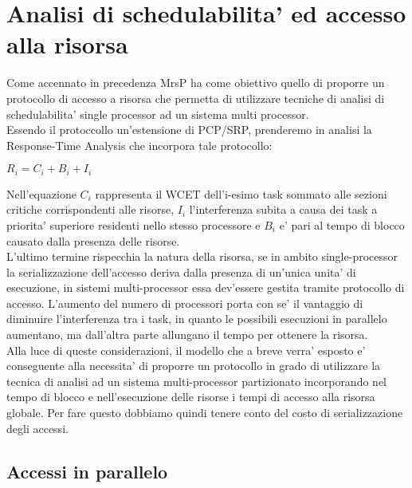 \documentclass[a4paper,11pt]{article}
\begin{document}
\section{Analisi di schedulabilita' ed accesso alla risorsa}

\noindent Come accennato in precedenza MrsP ha come obiettivo quello di proporre un protocollo di accesso a risorsa che permetta di utilizzare tecniche di analisi di schedulabilita' single processor ad un sistema multi processor.\\

\noindent Essendo il protoccollo un'estensione di PCP/SRP, prenderemo in analisi la Response-Time Analysis che incorpora tale protocollo:

\begin{center}
$R_i = C_i + B_i + I_i$
\end{center}

\noindent Nell'equazione $C_i$ rappresenta il WCET dell'i-esimo task sommato alle sezioni critiche corrispondenti alle risorse, $I_i$ l'interferenza subita a causa dei task a priorita' superiore residenti nello stesso processore e $B_i$ e' pari al tempo di blocco causato dalla presenza delle risorse.\\

\noindent L'ultimo termine rispecchia la natura della risorsa, se in ambito single-processor la serializzazione dell'accesso deriva dalla presenza di un'unica unita' di esecuzione, in sistemi multi-processor essa dev'essere gestita tramite protocollo di accesso. L'aumento del numero di processori porta con se' il vantaggio di diminuire l'interferenza tra i task, in quanto le possibili esecuzioni in parallelo aumentano, ma dall'altra parte allungano il tempo per ottenere la risorsa.\\

\noindent Alla luce di queste considerazioni, il modello che a breve verra' esposto e' conseguente alla necessita' di proporre un protocollo in grado di utilizzare la tecnica di analisi ad un sistema multi-processor partizionato incorporando nel tempo di blocco e nell'esecuzione delle risorse i tempi di accesso alla risorsa globale. Per fare questo dobbiamo quindi tenere conto del costo di serializzazione degli accessi.\\

\subsection{Accessi in parallelo}
\end{document}
